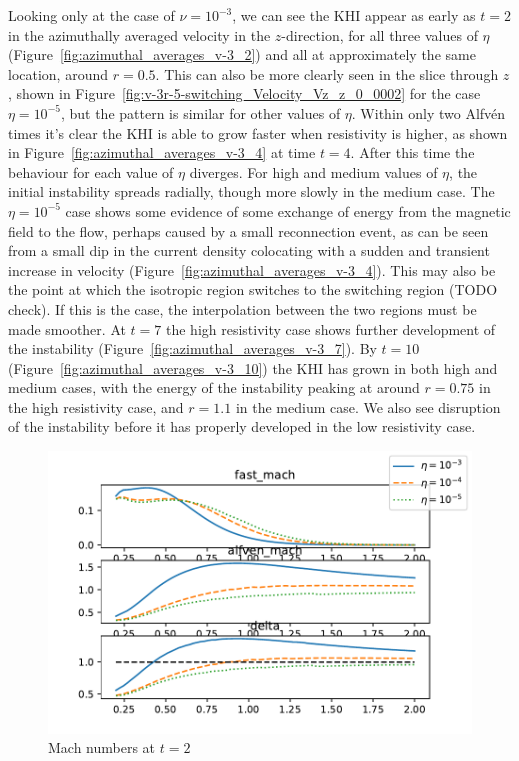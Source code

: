 Looking only at the case of $\nu = 10^{-3}$, we can see the KHI appear as early as $t=2$ in the azimuthally averaged velocity in the $z$-direction, for all three values of $\eta$ (Figure~\ref{fig:azimuthal_averages_v-3_2}) and all at approximately the same location, around $r=0.5$. This can also be more clearly seen in the slice through $z$, shown in Figure~\ref{fig:v-3r-5-switching_Velocity_Vz_z_0_0002} for the case $\eta=10^{-5}$, but the pattern is similar for other values of $\eta$. Within only two Alfv\'en times it's clear the KHI is able to grow faster when resistivity is higher, as shown in Figure~\ref{fig:azimuthal_averages_v-3_4} at time $t=4$. After this time the behaviour for each value of $\eta$ diverges. For high and medium values of $\eta$, the initial instability spreads radially, though more slowly in the medium case. The $\eta=10^{-5}$ case shows some evidence of some exchange of energy from the magnetic field to the flow, perhaps caused by a small reconnection event, as can be seen from a small dip in the current density colocating with a sudden and transient increase in velocity (Figure~\ref{fig:azimuthal_averages_v-3_4}). This may also be the point at which the isotropic region switches to the switching region (TODO check). If this is the case, the interpolation between the two regions must be made smoother. At $t=7$ the high resistivity case shows further development of the instability (Figure~\ref{fig:azimuthal_averages_v-3_7}). By $t=10$ (Figure~\ref{fig:azimuthal_averages_v-3_10}) the KHI has grown in both high and medium cases, with the energy of the instability peaking at around $r=0.75$ in the high resistivity case, and $r=1.1$ in the medium case. We also see disruption of the instability before it has properly developed in the low resistivity case.

\begin{figure}[h]
  \centering
  \includegraphics[width=0.8\linewidth]{./images/null_point_khi/mach_numbersv-32.pdf}
  \caption{Mach numbers at $t=2$}
  \label{fig:mach_numbersv_32}
\end{figure}

